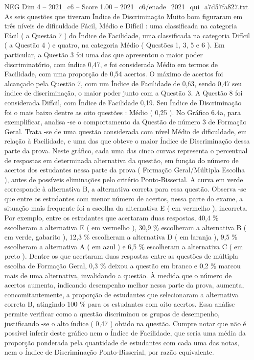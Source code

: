 \begin{textsample}{NEG Dim 4 – 2021\_c6 – Score 1.00 – 2021\_c6/enade\_2021\_qui\_a7d57fa827.txt}
As seis questões que tiveram Índice de Discriminação Muito bom figuraram em três níveis de dificuldade Fácil, Médio e Difícil : uma classificada na categoria Fácil ( a Questão 7 ) do Índice de Facilidade, uma classificada na categoria Difícil ( a Questão 4 ) e quatro, na categoria Médio ( Questões 1, 3, 5 e 6 ).
Em particular, a Questão 3 foi uma das que apresentou o maior poder discriminatório, com índice 0,47, e foi considerada Médio em termos de Facilidade, com uma proporção de 0,54 acertos.
O máximo de acertos foi alcançado pela Questão 7, com um Índice de Facilidade de 0,63, sendo 0,47 seu índice de discriminação, o maior poder junto com a Questão 3.
A Questão 8 foi considerada Difícil, com Índice de Facilidade 0,19.
Seu Índice de Discriminação foi o mais baixo dentre as oito questões : Médio ( 0,25 ).
No Gráfico 6.4a, para exemplificar, analisa -se o comportamento da Questão de número 3 de Formação Geral.
Trata -se de uma questão considerada com nível Médio de dificuldade, em relação à Facilidade, e uma das que obteve o maior Índice de Discriminação dessa parte da prova.
Neste gráfico, cada uma das cinco curvas representa o percentual de respostas em determinada alternativa da questão, em função do número de acertos dos estudantes nessa parte da prova ( Formação Geral/Múltipla Escolha ), antes de possíveis eliminações pelo critério Ponto-Bisserial.
A curva em verde corresponde à alternativa B, a alternativa correta para essa questão.
Observa -se que entre os estudantes com menor número de acertos, nessa parte do exame, a situação mais frequente foi a escolha da alternativa E ( em vermelho ), incorreta.
Por exemplo, entre os estudantes que acertaram duas respostas, 40,4 \% escolheram a alternativa E ( em vermelho ), 30,9 \% escolheram a alternativa B ( em verde, gabarito ), 12,3 \% escolheram a alternativa D ( em laranja ), 9,5 \% escolheram a alternativa A ( em azul ) e 6,5 \% escolheram a alternativa C ( em preto ).
Dentre os que acertaram duas respostas entre as questões de múltipla escolha de Formação Geral, 0,3 \% deixou a questão em branco e 0,2 \% marcou mais de uma alternativa, invalidando a questão.
À medida que o número de acertos aumenta, indicando desempenho melhor nessa parte da prova, aumenta, concomitantemente, a proporção de estudantes que selecionaram a alternativa correta B, atingindo 100 \% para os estudantes com oito acertos.
Essa análise permite verificar como a questão discriminou os grupos de desempenho, justificando -se o alto índice ( 0,47 ) obtido na questão.
Cumpre notar que não é possível inferir deste gráfico nem o Índice de Facilidade, que seria uma média da proporção ponderada pela quantidade de estudantes com cada uma das notas, nem o Índice de Discriminação Ponto-Bisserial, por razão equivalente.

\end{textsample}
